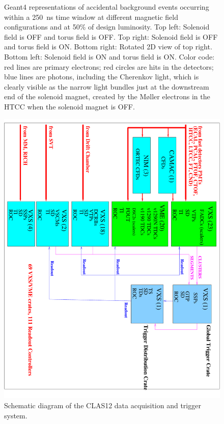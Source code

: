 \documentclass[final,3p,twocolumn]{elsarticle}
\begin{document}
\begin{figure}[htbp!]
\caption{Geant4 representations of accidental background events occurring within a 250~ns time window at different
  magnetic field configurations and at 50\% of design luminosity. Top left: Solenoid field is OFF and torus field is OFF.
  Top right: Solenoid field is OFF and torus field is ON. Bottom right: Rotated 2D view of top right. Bottom left: Solenoid
  field is ON and torus field is ON. Color code: red lines are primary electrons; red circles are hits in the detectors; blue
  lines are photons, including the Cherenkov light, which is clearly visible as the narrow light bundles just at the
  downstream end of the solenoid magnet, created by the M{\o}ller electrons in the HTCC when the solenoid magnet is
  OFF.}
  \label{gemc-event}
\end{figure}

\begin{figure}[htbp!]
\centerline{\includegraphics[angle=90,width=1.5\columnwidth]{clas12-daq-1.pdf}}
\caption{Schematic diagram of the CLAS12 data acquisition and trigger system.}
\label{daq}
\end{figure}
\end{document}
